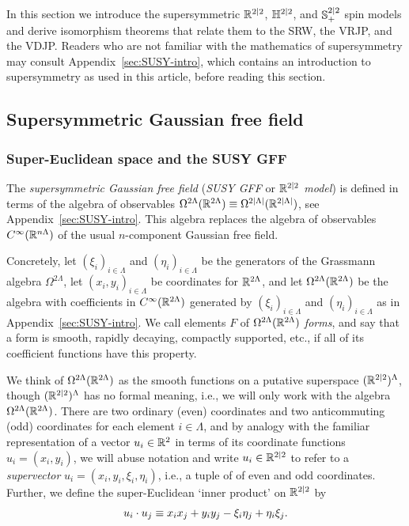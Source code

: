 \documentclass[11pt,a4paper]{article}
\begin{document}
In this section we introduce the supersymmetric $\mathbb{R}^{2|2}$,
$\mathbb{H}^{2|2}$, and ${\mathbb S}^{2|2}_{+}$ spin models and derive isomorphism
theorems that relate them to the SRW, the VRJP, and the VDJP.  Readers who
are not familiar with the mathematics of supersymmetry may consult
Appendix~\ref{sec:SUSY-intro}, which contains an introduction to
supersymmetry as used in this article, before reading this section.


\subsection{Supersymmetric Gaussian free field}
\label{sec:susy-gaussian-free}

\subsubsection{Super-Euclidean space and the SUSY GFF}
\label{sec:SUSYGFF}

The \emph{supersymmetric Gaussian free field} (\emph{SUSY GFF} or
\emph{$\mathbb{R}^{2|2}$ model}) is defined in terms
of the algebra of observables $\Omega^{2\Lambda}(\mathbb{R}^{2\Lambda})
\equiv \Omega^{2|\Lambda|}(\mathbb{R}^{2|\Lambda|})$, see
Appendix~\ref{sec:SUSY-intro}.
This algebra replaces the algebra of
observables $C^\infty(\mathbb{R}^{n\Lambda})$ of the usual $n$-component
Gaussian free field.

Concretely, let $(\xi_{i})_{i\in\Lambda}$ and
$(\eta_{i})_{i\in\Lambda}$ be the generators of the Grassmann algebra
$\Omega^{2\Lambda}$, let $(x_{i},y_{i})_{i\in\Lambda}$ be coordinates
for $\mathbb{R}^{2\Lambda}$, and let $\Omega^{2\Lambda}(\mathbb{R}^{2\Lambda})$ be the
algebra with coefficients in $C^{\infty}(\mathbb{R}^{2\Lambda})$ generated by
$(\xi_{i})_{i\in\Lambda}$ and $(\eta_{i})_{i\in\Lambda}$ as in
Appendix~\ref{sec:SUSY-intro}.  We call elements $F$ of
$\Omega^{2\Lambda}(\mathbb{R}^{2\Lambda})$ \emph{forms}, and say that a form
is smooth, rapidly decaying, compactly supported, etc., if all of its
coefficient functions have this property.

We think of $\Omega^{2\Lambda}(\mathbb{R}^{2\Lambda})$ as the smooth functions
on a putative superspace $(\mathbb{R}^{2|2})^{\Lambda}$, though
$(\mathbb{R}^{2|2})^{\Lambda}$ has no formal meaning, i.e., we will only
work with the algebra $\Omega^{2\Lambda}(\mathbb{R}^{2\Lambda})$.
There are two ordinary (even) coordinates and two anticommuting (odd)
coordinates for each element $i \in \Lambda$, and by
analogy with the familiar representation of a vector $u_i \in \mathbb{R}^{2}$
in terms of its coordinate functions $u_i = (x_i,y_i)$, we will abuse
notation and write $u_i \in \mathbb{R}^{2|2}$ to refer to a \emph{supervector}
$u_i = (x_i,y_i,\xi_i,\eta_i)$, i.e., a tuple of of even and odd coordinates.
Further, we define the super-Euclidean `inner product' on $\mathbb{R}^{2|2}$ by
\begin{equation}\label{eq:susy-euc-ip}
  u_i\cdot u_j \equiv  x_ix_j + y_iy_j - \xi_i\eta_j + \eta_i\xi_j.
\end{equation}
\end{document}
